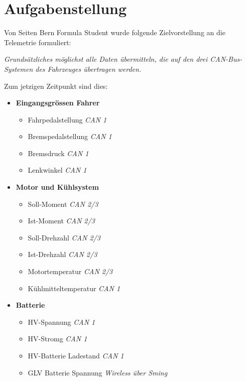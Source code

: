 \chapter{Aufgabenstellung}
\label{chap:aufgabenstellung}

Von Seiten Bern Formula Student wurde folgende Zielvorstellung an die Telemetrie formuliert:

\textit{Grundsätzliches möglichst alle Daten übermitteln, die auf den drei CAN-Bus-Systemen des Fahrzeuges übertragen werden.} 

Zum jetzigen Zeitpunkt sind dies:

\begin{itemize}
	\itemsep 1pt \parskip 0pt \parsep 0pt
	\item \textbf{Eingangsgrössen Fahrer}		
		\begin{itemize}
			\itemsep 1pt \parskip 0pt \parsep 0pt
			\item Fahrpedalstellung		\textit{CAN 1}
			\item Bremspedalstellung	\textit{CAN 1}
			\item Bremsdruck			\textit{CAN 1}
			\item Lenkwinkel			\textit{CAN 1}
		\end{itemize}
	\item \textbf{Motor und Kühlsystem}		
		\begin{itemize}
			\itemsep 1pt \parskip 0pt \parsep 0pt
			\item Soll-Moment			\textit{CAN 2/3}
			\item Ist-Moment			\textit{CAN 2/3}
			\item Soll-Drehzahl			\textit{CAN 2/3}
			\item Ist-Drehzahl			\textit{CAN 2/3}
			\item Motortemperatur		\textit{CAN 2/3}
			\item Kühlmitteltemperatur	\textit{CAN 1}
		\end{itemize}		
	\item \textbf{Batterie}		
		\begin{itemize}
			\itemsep 1pt \parskip 0pt \parsep 0pt
			\item HV-Spannung				\textit{CAN 1}
			\item HV-Stromg					\textit{CAN 1}
			\item HV-Batterie Ladestand		\textit{CAN 1}
			\item GLV Batterie Spannung		\textit{Wireless über Sming}
		\end{itemize}
					

\end{itemize}
